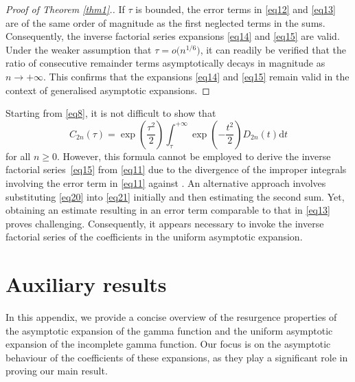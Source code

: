 \documentclass[11pt]{article}
\numberwithin{equation}{section}
\def\d{\mathrm{d}}
\numberwithin{equation}{section}
\begin{document}
\begin{proof}[Proof of Theorem \ref{thm1}.]
If $\tau$ is bounded, the error terms in \eqref{eq12} and \eqref{eq13} are of the same order of magnitude as the first neglected terms in the sums. Consequently, the inverse factorial series expansions \eqref{eq14} and \eqref{eq15} are valid. Under the weaker assumption that $\tau = o\big(n^{1/6}\big)$, it can readily be verified that the ratio of consecutive remainder terms asymptotically decays in magnitude as $n\to+\infty$. This confirms that the expansions \eqref{eq14} and \eqref{eq15} remain valid in the context of generalised asymptotic expansions.
\end{proof}

\begin{Remark} Starting from \eqref{eq8}, it is not difficult to show that
\begin{equation}\label{eq21}
C_{2n}(\tau ) = \exp\left(\frac{\tau ^2}{2}\right)\int_\tau^{+\infty} \exp \left(-\frac{t^2}{2}\right)D_{2n} (t)\d t
\end{equation}
for all $n\ge 0$. However, this formula cannot be employed to derive the inverse factorial series~\eqref{eq15} from \eqref{eq11} due to the divergence of the improper integrals involving the error term in \eqref{eq11} against . An alternative approach involves substituting \eqref{eq20} into \eqref{eq21} initially and then estimating the second sum. Yet, obtaining an estimate resulting in an error term comparable to that in \eqref{eq13} proves challenging. Consequently, it appears necessary to invoke the inverse factorial series of the coefficients in the uniform asymptotic expansion.
\end{Remark}


\appendix

\section{Auxiliary results}\label{appendixa}

In this appendix, we provide a concise overview of the resurgence properties of the asymptotic expansion of the gamma function and the uniform asymptotic expansion of the incomplete gamma function. Our focus is on the asymptotic behaviour of the coefficients of these expansions, as they play a significant role in proving our main result.
\end{document}
